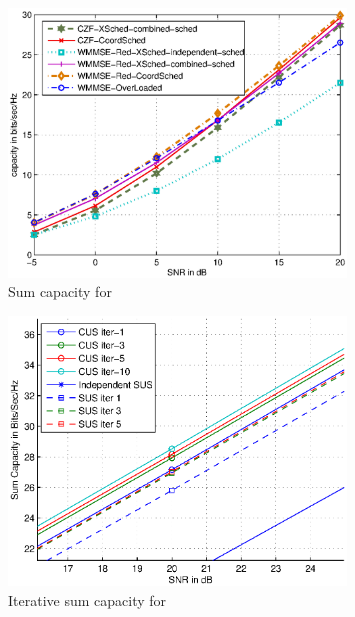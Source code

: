 \documentclass{beamer}
\begin{document}
\begin{frame}
\begin{figure}
\centering
\includegraphics[width=0.8\textwidth]{multi-bs-1}
\caption[short]{Sum capacity for }
\label{multi-bs-f1}
\end{figure}
\end{frame}

\begin{frame}
\begin{figure}
\centering
\includegraphics[width=0.8\textwidth]{multi-bs-2}
\caption[short]{Iterative sum capacity for }
\label{multi-bs-f2}
\end{figure}
\end{frame}
\end{document}
